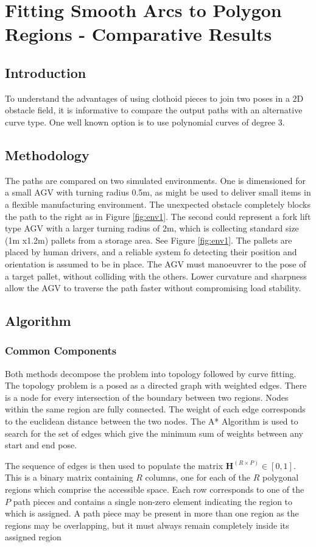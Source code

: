 \chapter{Fitting Smooth Arcs to Polygon Regions - Comparative Results}

\section{Introduction}
To understand the advantages of using clothoid pieces to join two poses in a 2D obstacle field, it is informative to compare the output paths with an alternative curve type. One well known option is to use polynomial curves of  degree 3. 

\section{Methodology}
The paths are compared on two simulated environments. One is dimensioned for a small AGV with turning radius 0.5m, as might be used to deliver small items in a flexible manufacturing environment. The unexpected obstacle completely blocks the path to the right as in Figure \ref{fig:env1}. The second could represent a fork lift type AGV with a larger turning radius of 2m, which is collecting standard size (1m x1.2m) pallets from a storage area. See Figure \ref{fig:env1}. The pallets are placed by human drivers, and a reliable system fo detecting their position and orientation is assumed to be in place. The AGV must manoeuvrer to the pose of a target pallet, without colliding with the others. Lower curvature and sharpness allow the AGV to traverse the path faster without compromising load stability.

\section{Algorithm}
\subsection{Common Components}
Both methods decompose the problem into topology followed by curve fitting. The topology problem is a posed as a directed graph with weighted edges. There is a node for every intersection of the boundary between two regions. Nodes within the same region are fully connected. The weight of each edge corresponds to the euclidean distance between the two nodes. The A* Algorithm is used to search for the set of edges which give the minimum sum of weights between any start and end pose.

The sequence of edges is then used to populate the matrix $\bm{H} ^{(R \times P)} \in [0,1]$. This is a binary matrix containing $R$ columns, one for each of the $R$ polygonal regions which comprise the accessible space. Each row corresponds to one of the $P$ path pieces and contains a single non-zero element indicating the region to which is assigned. A path piece may be present in more than one region as the regions may be overlapping, but it must always remain completely inside its assigned region  